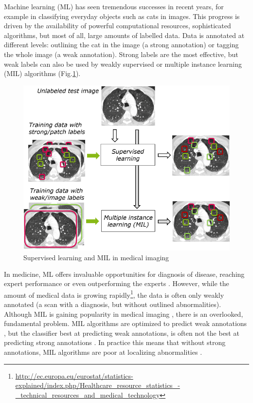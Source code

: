 \documentclass[serif, twocolumn, numeric, rga]{jote-article}
\begin{document}
Machine learning (ML) has seen tremendous successes in recent years, for example in classifying everyday objects such as cats in images. This progress is driven by the availability of powerful computational resources, sophisticated algorithms, but most of all, large amounts of labelled data. Data is annotated at different levels: outlining the cat in the image (a strong annotation) or tagging the whole image (a weak annotation). Strong labels are the most effective, but weak labels can also be used by weakly supervised or multiple instance learning (MIL) algorithms (Fig.\ref{fig:brain}). 

\begin{figure}
\centering \includegraphics{articles/RGAs/Veronika/brain.png}
\caption{Supervised learning and MIL in medical imaging}
\label{fig:brain}
\end{figure}


In medicine, ML offers invaluable opportunities for diagnosis of disease, reaching expert performance \cite{Kooi2017} or even outperforming the experts \cite{Rajpurkar2017, Bejnordi2017}. However, while the amount of medical data is growing rapidly\footnote{\url{http://ec.europa.eu/eurostat/statistics-explained/index.php/Healthcare_resource_statistics_-_technical_resources_and_medical_technology}}, the data is often only weakly annotated (a scan with a diagnosis, but without outlined abnormalities). Although MIL is gaining popularity in medical imaging \cite{Manivannan2016, Cheplygina2014, Kandemir2015, Melendez2014, Cheplygina2015b, Quellec2012}, there is an overlooked, fundamental problem. MIL algorithms are optimized to predict weak annotations \cite{Quellec2017}, but the classifier best at predicting weak annotations, is often not the best at predicting strong annotations \cite{Kandemir2015, Cheplygina2015b, Vanwinckelen2016, Carbonneau2016}. In practice this means that without strong annotations, MIL algorithms are poor at localizing abnormalities \cite{Li2018}.
\end{document}
